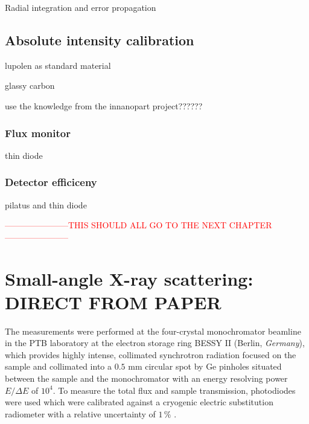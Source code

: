 Radial integration and error propagation

\subsection{Absolute intensity calibration}

lupolen as standard material \cite{kratky_absolute_1966,shaffer_calibration_1974}

glassy carbon \cite{perret_glassy_1972}

use the knowledge from the innanopart project??????
\subsubsection{Flux monitor}
thin diode
\subsubsection{Detector efficiceny}
pilatus and thin diode





















\textcolor{red}{-----------------------THIS SHOULD ALL GO TO THE NEXT CHAPTER-----------------------}











\section{Small-angle X-ray scattering: DIRECT FROM PAPER}
The measurements were performed at the four-crystal monochromator beamline in the PTB laboratory at the electron storage ring BESSY II (Berlin, \emph{Germany}), which provides highly intense, collimated synchrotron radiation focused on the sample and collimated into a \(0.5\) mm circular spot by Ge pinholes situated between the sample and the monochromator with an energy resolving power \( E/\Delta E \) of \( 10^4 \). To measure the total flux and sample transmission, photodiodes were used which were calibrated against a cryogenic electric substitution radiometer with a relative uncertainty of \( 1\,\% \) \cite{krumrey_high-accuracy_2001}.


